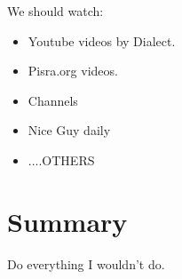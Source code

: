 \documentclass[../rzero]{subfiles}
\begin{document}
We should watch:
\begin{itemize}
  \item Youtube videos by Dialect.
  \item Pisra.org videos.
  \item Channels
  \item Nice Guy daily
  \item ....OTHERS
\end{itemize}

\section{Summary}
Do everything I wouldn't do. 
\end{document}
